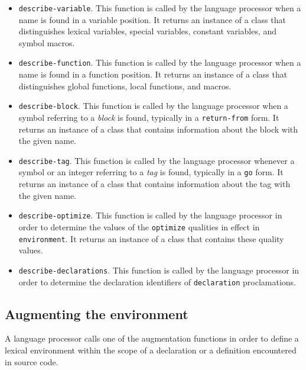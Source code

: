 \begin{itemize}
\item \texttt{describe-variable}.  This function is called by the
  language processor when a name is found in a variable position.  It
  returns an instance of a class that distinguishes lexical variables,
  special variables, constant variables, and symbol macros.
\item \texttt{describe-function}.  This function is called by the
  language processor when a name is found in a function position.  It
  returns an instance of a class that distinguishes global functions,
  local functions, and macros.
\item \texttt{describe-block}.  This function is called by the
  language processor when a symbol referring to a \emph{block} is
  found, typically in a \texttt{return-from} form.  It returns an
  instance of a class that contains information about the block with
  the given name.
\item \texttt{describe-tag}.  This function is called by the language
  processor whenever a symbol or an integer referring to a \emph{tag}
  is found, typically in a \texttt{go} form.  It returns an instance
  of a class that contains information about the tag with the given
  name.
\item \texttt{describe-optimize}.  This function is called by the
  language processor in order to determine the values of the
  \texttt{optimize} qualities in effect in \texttt{environment}.  It
  returns an instance of a class that contains these quality values.
\item \texttt{describe-declarations}.  This function is called by the
  language processor in order to determine the declaration identifiers
  of \texttt{declaration} proclamations.
\end{itemize}

\subsection{Augmenting the environment}

A language processor calls one of the augmentation functions in order
to define a lexical environment within the scope of a declaration or a
definition encountered in source code.
